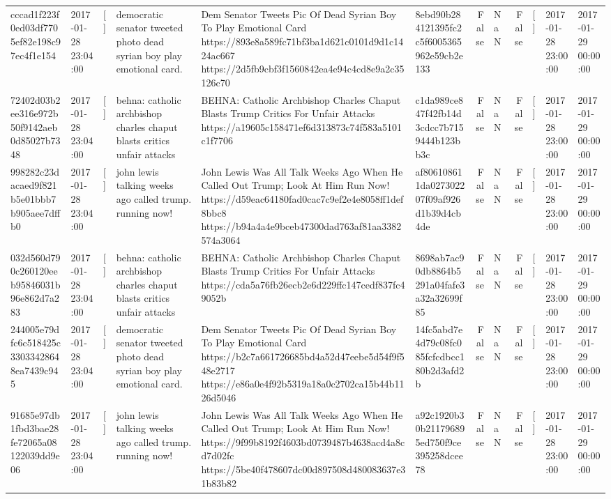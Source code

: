 \begin{tabular}{llllllrlrlll}
cccad1f223f0ed03df7705ef82e198c97ec4f1e154 & 2017-01-28 23:04:00 & [] & democratic senator tweeted photo dead syrian boy play emotional card. & Dem Senator Tweets Pic Of Dead Syrian Boy To Play Emotional Card https://893e8a589fc71bf3ba1d621c0101d9d1c1424ac667 https://2d5fb9cbf3f1560842ea4e94c4cd8e9a2c35126c70 & 8ebd90b284121395fc2c5f6005365962e59cb2e133 & False & NaN & False & [] & 2017-01-28 23:00:00 & 2017-01-29 00:00:00 \\
72402d03b2ee316e972b50f9142aeb0d85027b7348 & 2017-01-28 23:04:00 & [] & behna: catholic archbishop charles chaput blasts critics unfair attacks & BEHNA: Catholic Archbishop Charles Chaput Blasts Trump Critics For Unfair Attacks https://a19605c158471ef6d313873c74f583a5101c1f7706 & c1da989ce847f42fb14d3cdcc7b7159444b123bb3c & False & NaN & False & [] & 2017-01-28 23:00:00 & 2017-01-29 00:00:00 \\
998282c23dacaed9f821b5e01bbb7b905aee7dffb0 & 2017-01-28 23:04:00 & [] & john lewis talking weeks ago called trump. running now! & John Lewis Was All Talk Weeks Ago When He Called Out Trump; Look At Him Run Now! https://d59eac64180fad0cac7c9ef2e4e8058ff1def8bbc8 https://b94a4a4e9bceb47300dad763af81aa3382574a3064 & af806108611da027302207f09af926d1b39d4cb4de & False & NaN & False & [] & 2017-01-28 23:00:00 & 2017-01-29 00:00:00 \\
032d560d790c260120eeb95846031b96e862d7a283 & 2017-01-28 23:04:00 & [] & behna: catholic archbishop charles chaput blasts critics unfair attacks & BEHNA: Catholic Archbishop Charles Chaput Blasts Trump Critics For Unfair Attacks https://cda5a76fb26ecb2e6d229ffc147cedf837fc49052b & 8698ab7ac90db8864b5291a04fafe3a32a32699f85 & False & NaN & False & [] & 2017-01-28 23:00:00 & 2017-01-29 00:00:00 \\
244005e79dfc6c518425c33033428648ea7439c945 & 2017-01-28 23:04:00 & [] & democratic senator tweeted photo dead syrian boy play emotional card. & Dem Senator Tweets Pic Of Dead Syrian Boy To Play Emotional Card https://b2c7a661726685bd4a52d47eebe5d54f9f548e2717 https://e86a0e4f92b5319a18a0c2702ca15b44b1126d5046 & 14fc5abd7e4d79c08fc085fcfcdbcc180b2d3afd2b & False & NaN & False & [] & 2017-01-28 23:00:00 & 2017-01-29 00:00:00 \\
91685e97db1fbd3bae28fe72065a08122039dd9e06 & 2017-01-28 23:04:00 & [] & john lewis talking weeks ago called trump. running now! & John Lewis Was All Talk Weeks Ago When He Called Out Trump; Look At Him Run Now! https://9f99b8192f4603bd0739487b4638acd4a8cd7d02fc https://5be40f478607dc00d897508d480083637e31b83b82 & a92c1920b30b211796895ed750f9ce395258dcee78 & False & NaN & False & [] & 2017-01-28 23:00:00 & 2017-01-29 00:00:00 \\

\end{tabular}
